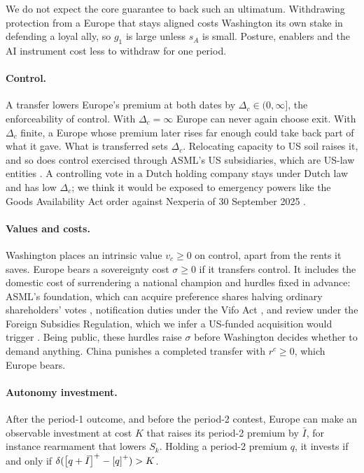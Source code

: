 We do not expect the core guarantee to back such an ultimatum. Withdrawing protection from a Europe that stays aligned costs Washington its own stake in defending a loyal ally, so $g_1$ is large unless $s_A$ is small. Posture, enablers and the AI instrument cost less to withdraw for one period.

\paragraph{Control.} A transfer lowers Europe's premium at both dates by $\Delta_c\in(0,\infty]$, the enforceability of control. With $\Delta_c=\infty$ Europe can never again choose exit. With $\Delta_c$ finite, a Europe whose premium later rises far enough could take back part of what it gave. What is transferred sets $\Delta_c$. Relocating capacity to US soil raises it, and so does control exercised through ASML's US subsidiaries, which are US-law entities \citep{asml2026subsidiaries}. A controlling vote in a Dutch holding company stays under Dutch law and has low $\Delta_c$; we think it would be exposed to emergency powers like the Goods Availability Act order against Nexperia of 30 September 2025 \citep{kst32637720}.

\paragraph{Values and costs.} Washington places an intrinsic value $v_c\ge 0$ on control, apart from the rents it saves. Europe bears a sovereignty cost $\sigma\ge 0$ if it transfers control. It includes the domestic cost of surrendering a national champion and hurdles fixed in advance: ASML's foundation, which can acquire preference shares halving ordinary shareholders' votes \citep{asml2026annual}, notification duties under the Vifo Act \citep{nl2022vifo, nl2023sensitief}, and review under the Foreign Subsidies Regulation, which we infer a US-funded acquisition would trigger \citep{eu2022fsr}. Being public, these hurdles raise $\sigma$ before Washington decides whether to demand anything. China punishes a completed transfer with $r^c\ge 0$, which Europe bears.

\paragraph{Autonomy investment.} After the period-1 outcome, and before the period-2 contest, Europe can make an observable investment at cost $K$ that raises its period-2 premium by $\bar I$, for instance rearmament that lowers $S_k$. Holding a period-2 premium $q$, it invests if and only if $\delta(\left[q+\bar I\right]^{+}-\left[q\right]^{+})>K$.

